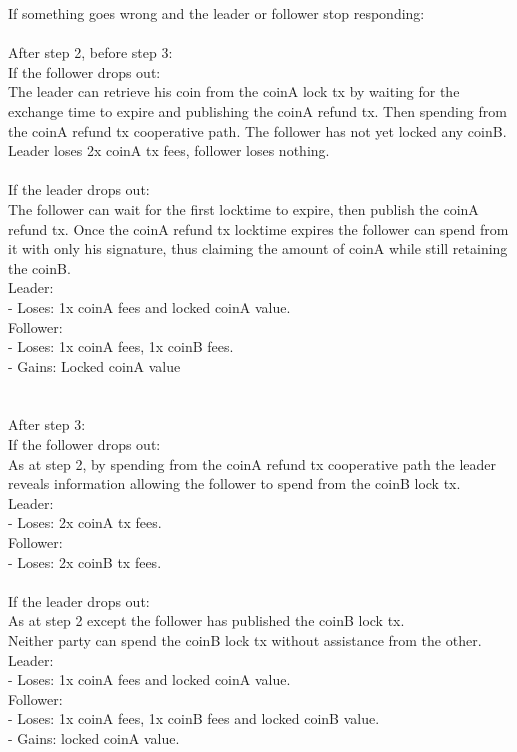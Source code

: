 \documentclass[a4paper]{article}
\begin{document}
If something goes wrong and the leader or follower stop responding:\\
\\
After step 2, before step 3:\\
If the follower drops out:\\
The leader can retrieve his coin from the coinA lock tx by waiting for
the exchange time to expire and publishing the coinA refund tx.  Then
spending from the coinA refund tx cooperative path.  The follower has
not yet locked any coinB.\\
Leader loses 2x coinA tx fees, follower loses nothing.\\
\\
If the leader drops out:\\
The follower can wait for the first locktime to expire, then publish the
coinA refund tx.  Once the coinA refund tx locktime expires the follower
can spend from it with only his signature, thus claiming the amount of
coinA while still retaining the coinB.\\
Leader:\\
 - Loses: 1x coinA fees and locked coinA value.\\
Follower:\\
 - Loses: 1x coinA fees, 1x coinB fees.\\
 - Gains: Locked coinA value\\
\\
\\
After step 3:\\
If the follower drops out:\\
As at step 2, by spending from the coinA refund tx cooperative path the
leader reveals information allowing the follower to spend from the coinB
lock tx.\\
Leader:\\
 - Loses: 2x coinA tx fees.\\
Follower:\\
 - Loses: 2x coinB tx fees.\\
\\
If the leader drops out:\\
As at step 2 except the follower has published the coinB lock tx.\\
Neither party can spend the coinB lock tx without assistance from the
other.\\
Leader:\\
 - Loses: 1x coinA fees and locked coinA value.\\
Follower:\\
 - Loses: 1x coinA fees, 1x coinB fees and locked coinB value.\\
 - Gains: locked coinA value.\\
\end{document}

